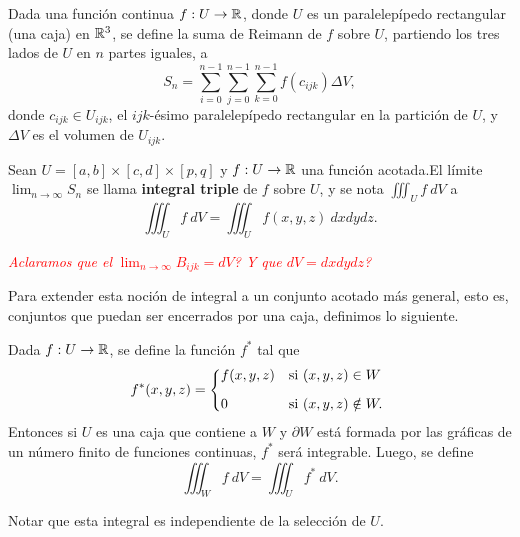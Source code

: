 \begin{definition}
Dada una funci\'on continua $f:U\to\mathbb{R}$, donde $U$ es un paralelep\'ipedo rectangular (una caja) en $\mathbb{R}^3$, se define la suma de Reimann de $f$ sobre $U$, partiendo los tres lados de $U$ en $n$ partes iguales, a
\[
    S_n=\sum_{i=0}^{n-1}\sum_{j=0}^{n-1}\sum_{k=0}^{n-1}f(c_{ijk})\Delta V,
\]  
donde $c_{ijk}\in U_{ijk}$, el $ijk$-\'esimo paralelep\'ipedo rectangular en la partici\'on de $U$, y $\Delta V$ es el volumen de $U_{ijk}$.
\end{definition}

\begin{definition} 
    Sean $U=[a,b]\times[c,d]\times[p,q]$ y $f:U\to\mathbb{R}$ una funci\'on acotada.El l\'imite $\lim_{n\to\infty}S_n$ se llama \textbf{integral triple} de $f$ sobre $U$, y se nota $\iiint_U f\:dV$ a
    \[
          \iiint_U f\:dV=\iiint_U f(x,y,z)\:dxdydz.
    \]
\end{definition}

\textcolor{red}{\textit{Aclaramos que el} $\lim_{n\to\infty}B_{ijk}=dV$\textit{? Y que $dV=dxdydz$?}}

Para extender esta noci\'on de integral a un conjunto acotado m\'as general, esto es, conjuntos que puedan ser encerrados por una caja, definimos lo siguiente. 

\begin{definition}
Dada $f:U\to\mathbb{R}$, se define la funci\'on $f^*$ tal que
\[
    f^*(x,y,z)=
    \begin{dcases*}
        f(x,y,z) & si $(x,y,z)\in W$ \\[.2cm]
        0        & si $(x,y,z)\notin W.$
    \end{dcases*}
\]
Entonces si $U$ es una caja que contiene a $W$ y $\partial W$ est\'a formada por las gr\'aficas de un n\'umero finito de funciones continuas, $f^*$ ser\'a integrable. Luego, se define
\[
    \iiint_W f\:dV=\iiint_U f^*\:dV.  
\]
\end{definition}

\begin{obs} 
    Notar que esta integral es independiente de la selecci\'on de $U$.
\end{obs}

